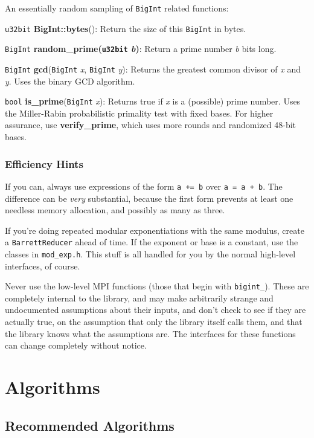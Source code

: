 \documentclass{article}
\newcommand{\filename}[1]{\texttt{#1}}
\newcommand{\function}[1]{\textbf{#1}}
\newcommand{\type}[1]{\texttt{#1}}
\renewcommand{\arg}[1]{\textsl{#1}}
\begin{document}
An essentially random sampling of \type{BigInt} related functions:

\type{u32bit} \function{BigInt::bytes}(): Return the size of this \type{BigInt}
in bytes.

\type{BigInt} \function{random\_prime(\type{u32bit} \arg{b})}: Return a prime
number \arg{b} bits long.

\type{BigInt} \function{gcd}(\type{BigInt} \arg{x}, \type{BigInt} \arg{y}):
Returns the greatest common divisor of \arg{x} and \arg{y}. Uses the binary
GCD algorithm.

\type{bool} \function{is\_prime}(\type{BigInt} \arg{x}): Returns true if
\arg{x} is a (possible) prime number. Uses the Miller-Rabin probabilistic
primality test with fixed bases. For higher assurance, use
\function{verify\_prime}, which uses more rounds and randomized 48-bit bases.

\subsubsection{Efficiency Hints}

If you can, always use expressions of the form \verb|a += b| over
\verb|a = a + b|. The difference can be \emph{very} substantial, because the
first form prevents at least one needless memory allocation, and possibly as
many as three.

If you're doing repeated modular exponentiations with the same modulus, create
a \type{BarrettReducer} ahead of time. If the exponent or base is a constant,
use the classes in \filename{mod\_exp.h}. This stuff is all handled for you by
the normal high-level interfaces, of course.

Never use the low-level MPI functions (those that begin with
\texttt{bigint\_}). These are completely internal to the library, and
may make arbitrarily strange and undocumented assumptions about their
inputs, and don't check to see if they are actually true, on the
assumption that only the library itself calls them, and that the
library knows what the assumptions are. The interfaces for these
functions can change completely without notice.

\pagebreak
\section{Algorithms}

\subsection{Recommended Algorithms}
\end{document}

